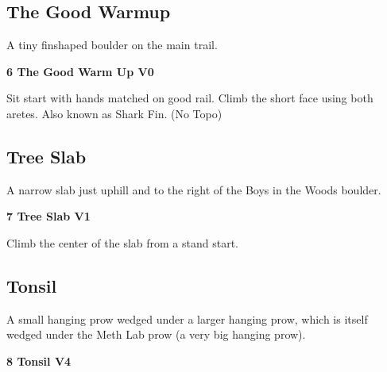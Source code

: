 \begin{multicols}{2}
\begin{minipage}{\columnwidth}
			\subsection*{The Good Warmup}\label{bf:The Good Warmup}
			A tiny finshaped boulder on the main trail.
			
			\end{minipage}
			
					\begin{minipage}{\linewidth}	
					\label{rt:The Good Warm Up}
\colorbox{green!20}{
\parbox{0.95\textwidth}{
\textbf{
6 The Good Warm Up V0   
}
}
}

					\begin{adjustwidth}{0.5cm}{}				
					Sit start with hands matched on good rail. Climb the short face using both aretes. Also known as Shark Fin.
						\newline (No Topo) 
					\end{adjustwidth}
					\end{minipage}
			\begin{minipage}{\columnwidth}
			\subsection*{Tree Slab}\label{bf:Tree Slab}
			A narrow slab just uphill and to the right of the Boys in the Woods boulder.
			
			\end{minipage}
			
					\begin{minipage}{\linewidth}	
					\label{rt:Tree Slab}
\colorbox{green!20}{
\parbox{0.95\textwidth}{
\textbf{
7 Tree Slab V1    
}
}
}

					\begin{adjustwidth}{0.5cm}{}				
					Climb the center of the slab from a stand start.
					\end{adjustwidth}
					\end{minipage}
			\begin{minipage}{\columnwidth}
			\subsection*{Tonsil}\label{bf:Tonsil}
			A small hanging prow wedged under a larger hanging prow, which is itself wedged under the Meth Lab prow (a very big hanging prow).
			
			\end{minipage}
			
					\begin{minipage}{\linewidth}	
					\label{rt:Tonsil}
\colorbox{RoyalBlue!20}{
\parbox{0.95\textwidth}{
\textbf{
8 Tonsil V4    
}
}
}


\end{minipage}
\end{multicols}

